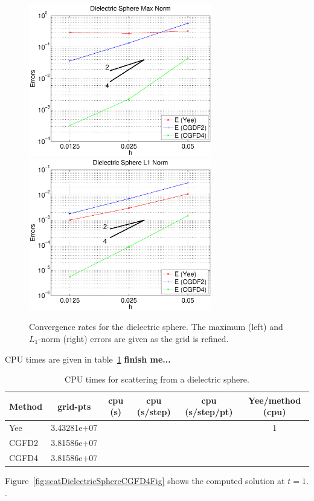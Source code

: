 \documentclass[11pt]{article}
\begin{document}
\begin{figure}[hbt]
\begin{center}\small
\includegraphics[width=8cm]{dielectricSphere/dielectricSphereConvergenceRatesMaxNorm.eps}
\includegraphics[width=8cm]{dielectricSphere/dielectricSphereConvergenceRatesL1Norm.eps}
%
\caption{Convergence rates for the dielectric sphere.
  The maximum (left) and $L_1$-norm (right) errors are given as the grid is refined. }
\label{fig:dielectricSphereConvergenceRatesMaxNorm}
\end{center}
\end{figure}

CPU times are given in table~\ref{tab:dielectricSphereCPU} {\bf finish me...}

\begin{table}[hbt]
\begin{center}
\begin{tabular}{|l|c|c|c|c|c|}\hline
Method  & grid-pts  & cpu (s)      & cpu (s/step) & cpu (s/step/pt) &  Yee/method (cpu) \\ \hline
Yee     &  3.43281e+07    &              &              &               &     1    \\
CGFD2   &  3.81586e+07    &              &              &               &           \\
CGFD4   &  3.81586e+07    &              &              &               &          \\ \hline
\end{tabular}
\end{center}
\caption{ CPU times for scattering from a dielectric sphere.}\label{tab:dielectricSphereCPU}
\end{table}

Figure~\ref{fig:scatDielectricSphereCGFD4Fig} shows the computed solution at $t=1.$.




\clearpage


\end{document}
